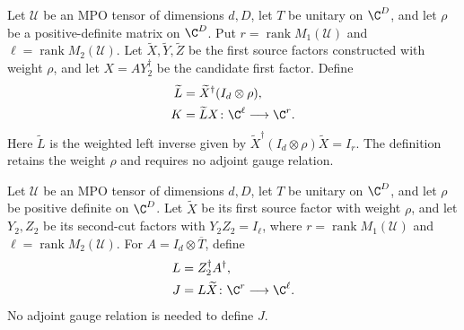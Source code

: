 \begin{definition}
    \label{def:mpug_inverse_cut_comparison_k}
    \leanok
    Let $\mathcal U$ be an MPO tensor of dimensions $d,D$, let $T$ be
    unitary on $\C^D$, and let $\rho$ be a positive-definite matrix on
    $\C^D$. Put $r=\operatorname{rank}M_1(\mathcal U)$ and
    $\ell=\operatorname{rank}M_2(\mathcal U)$. Let
    $\widetilde X,\widetilde Y,\widetilde Z$ be the first source factors
    constructed with weight $\rho$, and let $X=AY_2^\dagger$ be the
    candidate first factor. Define
    \begin{align}
        \widetilde L & =\widetilde X^\dagger(I_d\otimes\rho),           \\
        K            & =\widetilde L X\colon\C^\ell\longrightarrow\C^r.
    \end{align}
    Here $\widetilde L$ is the weighted left inverse given by
    $\widetilde X^\dagger(I_d\otimes\rho)\widetilde X=I_r$.
    The definition retains the weight $\rho$ and requires no adjoint gauge
    relation.
\end{definition}

\begin{definition}
    \label{def:mpug_inverse_cut_comparison_j}
    \leanok
    Let $\mathcal U$ be an MPO tensor of dimensions $d,D$, let $T$ be
    unitary on $\C^D$, and let $\rho$ be positive definite on $\C^D$.
    Let $\widetilde X$ be its first source factor with weight $\rho$,
    and let $Y_2,Z_2$ be its second-cut factors with $Y_2Z_2=I_\ell$,
    where $r=\operatorname{rank}M_1(\mathcal U)$ and
    $\ell=\operatorname{rank}M_2(\mathcal U)$. For
    $A=I_d\otimes\overline T$, define
    \begin{align}
        L & =Z_2^\dagger A^\dagger,                         \\
        J & =L\widetilde X\colon\C^r\longrightarrow\C^\ell.
    \end{align}
    No adjoint gauge relation is needed to define $J$.
\end{definition}

